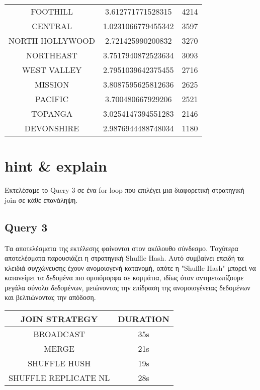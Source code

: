 \documentclass{article}
\begin{document}
\begin{center}
\begin{tabular}{|c|c|c|}
FOOTHILL & 3.612771771528315 & 4214 \\
CENTRAL & 1.0231066779455342 & 3597 \\
NORTH HOLLYWOOD & 2.721425990200832 & 3270 \\
NORTHEAST & 3.7517940872523634 & 3093 \\
WEST VALLEY & 2.7951039642375455 & 2716 \\
MISSION & 3.8087595625812636 & 2625 \\
PACIFIC & 3.700480667929206 & 2521 \\
TOPANGA & 3.0254147394551283 & 2146 \\
DEVONSHIRE & 2.9876944488748034 & 1180 \\
\hline
\end{tabular}
\end{center} 


\vspace{3\baselineskip}
\section{hint \& explain}

Εκτελέσαμε το Query 3 σε ένα for loop που επιλέγει μια διαφορετική στρατηγική join σε 
κάθε επανάληψη.

\subsection*{Query 3}

Τα αποτελέσματα της εκτέλεσης φαίνονται στον ακόλουθο σύνδεσμο. Ταχύτερα αποτελέσματα 
παρουσιάζει η στρατηγική Shuffle Hash. Αυτό συμβαίνει επειδή τα κλειδιά συγχώνευσης έχουν 
ανομοιογενή κατανομή, οπότε η "Shuffle Hash" μπορεί να κατανείμει τα δεδομένα πιο ομοιόμορφα σε κομμάτια, ιδίως όταν αντιμετωπίζουμε μεγάλα σύνολα δεδομένων, μειώνοντας την επίδραση της ανομοιογένειας δεδομένων και βελτιώνοντας την απόδοση.\\

\begin{center}
\begin{tabular}{|c|c|}
\hline
\textbf{JOIN STRATEGY} & \textbf{DURATION} \\
\hline
BROADCAST & 35s \\
\hline
MERGE & 21s \\
\hline
SHUFFLE HUSH & 19s \\
\hline
SHUFFLE REPLICATE NL & 28s \\
\hline
\end{tabular}
\end{center} 
\end{document}
